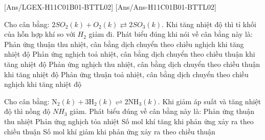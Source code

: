 [Ans/LGEX-H11C01B01-BTTL02]
[Ans/Ans-H11C01B01-BTTL02]
\begin{ex}
	Cho cân bằng: $2SO_2(k)+O_2(k) \rightleftarrows 2SO_3(k)$. Khi tăng nhiệt độ thì tỉ khối của hỗn hợp khí so với $H_2$ giảm đi. Phát biểu đúng khi nói về cân bằng này là:
	\choice
	{Phản ứng thuận thu nhiệt, cân bằng dịch chuyển theo chiều nghịch khi tăng nhiệt độ}
	{Phản ứng nghịch toả nhiệt, cân bằng dịch chuyển theo chiều thuận khi tăng nhiệt độ}
	{\True Phản ứng nghịch thu nhiệt, cân bằng dịch chuyển theo chiều thuận khi tăng nhiệt độ}
	{Phản ứng thuận toả nhiệt, cân bằng dịch chuyển theo chiều nghịch khi tăng nhiệt độ}
\end{ex}
\begin{ex}
	Cho cân bằng: $\text{N}_2(k) + 3\text{H}_2(k) \rightleftharpoons 2\text{NH}_3(k)$. Khi giảm áp suất và tăng nhiệt độ thì nồng độ $NH_3$ giảm. Phát biểu đúng về cân bằng này là:
	\choice
	{Phản ứng thuận thu nhiệt}
	{Phản ứng nghịch tỏa nhiệt}
	{Số mol khí tăng khi phản ứng xảy ra theo chiều thuận}
	{\True Số mol khí giảm khi phản ứng xảy ra theo chiều thuận}
\end{ex}

